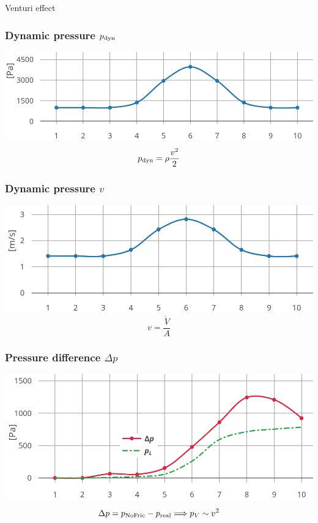 \documentclass{article}
\begin{document}
\begin{multicols}{2}
\begin{examplebox}{Venturi effect}
    \subsubsection{Dynamic pressure $p_{\rm dyn}$}
    \includegraphics[width=\textwidth]{media/venturi_dyn.png}
    \vspace*{-0.3cm}
    \begin{equation}
        p_{\rm dyn} = \rho\dfrac{v^2}{2}
    \end{equation}
    \subsubsection{Dynamic pressure $v$}
    \includegraphics[width=\textwidth]{media/venturi_velocity.png}
    \vspace*{-0.3cm}
    \begin{equation}
        v=\dfrac{\dot{V}}{A}
    \end{equation}
    \subsubsection{Pressure difference $\Delta p$}
    \includegraphics[width=\textwidth]{media/venturi_pressure.png}
    \vspace*{-0.3cm}
    \begin{equation}
        \Delta p = p_{\rm NoFric} - p_{\rm real} \Longrightarrow p_V \sim v^2
    \end{equation}
\end{examplebox}


\end{multicols}
\end{document}
